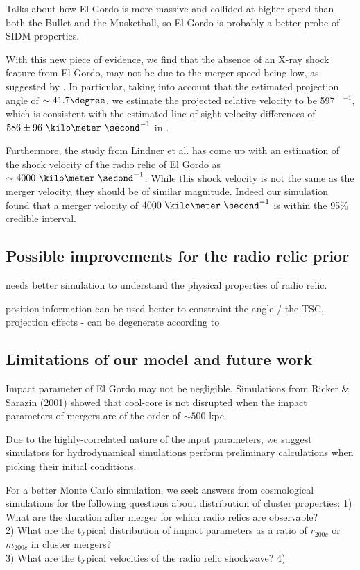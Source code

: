 Talks about how El Gordo is more massive and collided at higher speed than
both the Bullet and the Musketball, so El Gordo is probably a better probe of SIDM properties.

With this new piece of evidence, we find that the absence of an
X-ray shock feature from El Gordo, may not be due to the merger speed being
low, as suggested by . 
In particular, taking into account that the estimated projection angle of 
$\sim 41.7\degree$, we estimate the projected relative velocity to be 597
\kilo \meter~\second$^{-1}$, which is consistent with the estimated
line-of-sight velocity differences of $586 \pm  96~\kilo \meter
~\second^{-1}$ in . 

Furthermore, the study from \cite{L13} Lindner et al. has come up
with an estimation of the shock velocity of the radio relic of El Gordo as 
$\sim 4000~\kilo \meter~\second^{-1}$. While this shock velocity is not the
same as the merger velocity, they should be of similar magnitude. Indeed
our simulation found that a merger velocity of $4000~\kilo
\meter~\second^{-1}$ is within the 95\% credible interval. 

\subsection{Possible improvements for the radio relic prior}
%
needs better simulation to understand the physical properties of radio relic.

position information can be used better to constraint the angle / the TSC,
projection effects - can be degenerate according to \cite{S13}   

\subsection{Limitations of our model and future work} 
%
Impact parameter of El Gordo may not be negligible. 
Simulations from Ricker \& Sarazin (2001) showed that cool-core is not
disrupted  when the impact parameters of mergers are of the order of $\sim 500$ kpc.   


Due to the highly-correlated nature of the input parameters, 
we suggest simulators for hydrodynamical simulations perform preliminary
calculations when picking their initial conditions.   

For a better Monte Carlo simulation, we seek answers from cosmological
simulations for the following questions about distribution of cluster
properties: 
1) What are the duration after merger for which radio relics are
observable?\\ 
2) What are the typical distribution of impact parameters 
as a ratio of $r_{200c}$ or $m_{200c}$ in cluster mergers?\\ 
3) What are the typical velocities of the radio relic shockwave? 
4)


